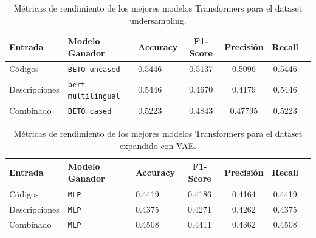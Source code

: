 \documentclass[12pt,a4paper,onecolumn,oneside]{report}
\begin{document}
\begin{table}[htbp]
\centering
\small
\renewcommand{\arraystretch}{1.25}
\begin{tabular}{|l|l|l|c|c|c|c|}
\hline
\rowcolor[RGB]{239,239,239}
\textbf{Entrada} & \textbf{Modelo Ganador} & \textbf{Accuracy} & \textbf{F1-Score} & \textbf{Precisión} & \textbf{Recall} \\ \hline

Códigos & \texttt{BETO uncased} & 0.5446 & 0.5137 & 0.5096 & 0.5446 \\
Descripciones & \texttt{bert-multilingual} & 0.5446 & 0.4670 & 0.4179 & 0.5446 \\
Combinado & \texttt{BETO cased} & 0.5223 & 0.4843 & 0.47795 & 0.5223 \\ \hline

\end{tabular}
\caption{Métricas de rendimiento de los mejores modelos Transformers para el dataset undersampling.}
\label{tab:comparativa_nlp_metricas_undersampling}
\end{table}

\begin{table}[htbp]
\centering
\small
\renewcommand{\arraystretch}{1.25}
\begin{tabular}{|l|l|l|c|c|c|c|}
\hline
\rowcolor[RGB]{239,239,239}
\textbf{Entrada}  & \textbf{Modelo Ganador} & \textbf{Accuracy} & \textbf{F1-Score} & \textbf{Precisión} & \textbf{Recall} \\ \hline

Códigos & \texttt{MLP} & 0.4419 & 0.4186 & 0.4164 & 0.4419 \\
Descripciones & \texttt{MLP} & 0.4375 & 0.4271 & 0.4262 & 0.4375 \\
Combinado & \texttt{MLP} & 0.4508 & 0.4411 & 0.4362 & 0.4508 \\ \hline

\end{tabular}
\caption{Métricas de rendimiento de los mejores modelos Transformers para el dataset expandido con VAE.}
\label{tab:comparativa_nlp_metricas_undersampling_vae}
\end{table}
\end{document}
